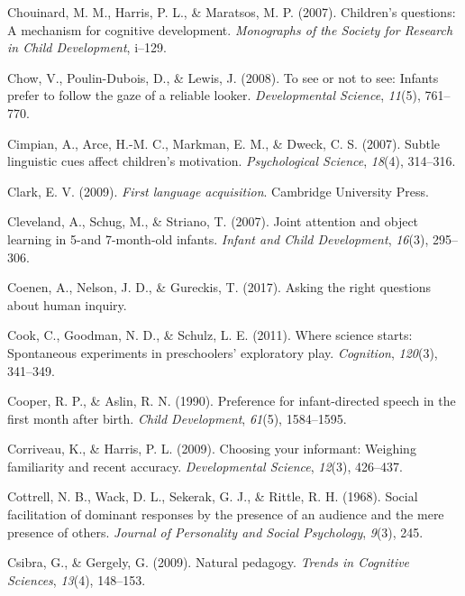 \documentclass[english,floatsintext,man]{apa6}
\theoremstyle{definition}
\theoremstyle{definition}
\theoremstyle{definition}
\theoremstyle{remark}
\begin{document}
\hypertarget{ref-chouinard2007children}{}
Chouinard, M. M., Harris, P. L., \& Maratsos, M. P. (2007). Children's
questions: A mechanism for cognitive development. \emph{Monographs of
the Society for Research in Child Development}, i--129.

\hypertarget{ref-chow2008see}{}
Chow, V., Poulin-Dubois, D., \& Lewis, J. (2008). To see or not to see:
Infants prefer to follow the gaze of a reliable looker.
\emph{Developmental Science}, \emph{11}(5), 761--770.

\hypertarget{ref-cimpian2007subtle}{}
Cimpian, A., Arce, H.-M. C., Markman, E. M., \& Dweck, C. S. (2007).
Subtle linguistic cues affect children's motivation. \emph{Psychological
Science}, \emph{18}(4), 314--316.

\hypertarget{ref-clark2009first}{}
Clark, E. V. (2009). \emph{First language acquisition}. Cambridge
University Press.

\hypertarget{ref-cleveland2007joint}{}
Cleveland, A., Schug, M., \& Striano, T. (2007). Joint attention and
object learning in 5-and 7-month-old infants. \emph{Infant and Child
Development}, \emph{16}(3), 295--306.

\hypertarget{ref-coenen2017asking}{}
Coenen, A., Nelson, J. D., \& Gureckis, T. (2017). Asking the right
questions about human inquiry.

\hypertarget{ref-cook2011science}{}
Cook, C., Goodman, N. D., \& Schulz, L. E. (2011). Where science starts:
Spontaneous experiments in preschoolers' exploratory play.
\emph{Cognition}, \emph{120}(3), 341--349.

\hypertarget{ref-cooper1990preference}{}
Cooper, R. P., \& Aslin, R. N. (1990). Preference for infant-directed
speech in the first month after birth. \emph{Child Development},
\emph{61}(5), 1584--1595.

\hypertarget{ref-corriveau2009choosing}{}
Corriveau, K., \& Harris, P. L. (2009). Choosing your informant:
Weighing familiarity and recent accuracy. \emph{Developmental Science},
\emph{12}(3), 426--437.

\hypertarget{ref-cottrell1968social}{}
Cottrell, N. B., Wack, D. L., Sekerak, G. J., \& Rittle, R. H. (1968).
Social facilitation of dominant responses by the presence of an audience
and the mere presence of others. \emph{Journal of Personality and Social
Psychology}, \emph{9}(3), 245.

\hypertarget{ref-csibra2009natural}{}
Csibra, G., \& Gergely, G. (2009). Natural pedagogy. \emph{Trends in
Cognitive Sciences}, \emph{13}(4), 148--153.
\end{document}
